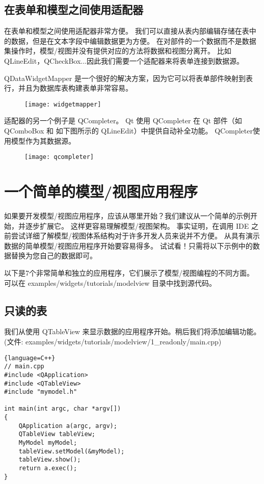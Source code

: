\subsection{在表单和模型之间使用适配器}

在表单和模型之间使用适配器非常方便。
我们可以直接从表内部编辑存储在表中的数据，但是在文本字段中编辑数据更为方便。
在对部件的一个数据而不是数据集操作时，模型/视图并没有提供对应的方法将数据和视图分离开。
比如 QLineEdit，QCheckBox...因此我们需要一个适配器来将表单连接到数据源。

QDataWidgetMapper 是一个很好的解决方案，因为它可以将表单部件映射到表行，并且为数据库表构建表单非常容易。

\begin{figure}[hbt!]  
\texttt{[image: widgetmapper]}
\end{figure}

适配器的另一个例子是 QCompleter。
Qt 使用 QCompleter 在 Qt 部件（如 QComboBox 和 如下图所示的 QLineEdit）中提供自动补全功能。
QCompleter使用模型作为其数据源。
	
\begin{figure}[hbt!]  
\texttt{[image: qcompleter]}
\end{figure}

\section{一个简单的模型/视图应用程序}

如果要开发模型/视图应用程序，应该从哪里开始？我们建议从一个简单的示例开始，并逐步扩展它。
这样更容易理解模型/视图架构。
事实证明，在调用 IDE 之前尝试详细了解模型/视图体系结构对于许多开发人员来说并不方便。
从具有演示数据的简单模型/视图应用程序开始要容易得多。
试试看！只需将以下示例中的数据替换为您自己的数据即可。

以下是7个非常简单和独立的应用程序，它们展示了模型/视图编程的不同方面。
可以在 examples/widgets/tutorials/modelview 目录中找到源代码。

\subsection{只读的表}

我们从使用 QTableView 来显示数据的应用程序开始。稍后我们将添加编辑功能。
(文件: examples/widgets/tutorials/modelview/1\_readonly/main.cpp)

\begin{lstlisting}{language=C++}
// main.cpp
#include <QApplication>
#include <QTableView>
#include "mymodel.h"
	
int main(int argc, char *argv[])
{
	QApplication a(argc, argv);
	QTableView tableView;
	MyModel myModel;
	tableView.setModel(&myModel);
	tableView.show();
	return a.exec();
}
\end{lstlisting}

